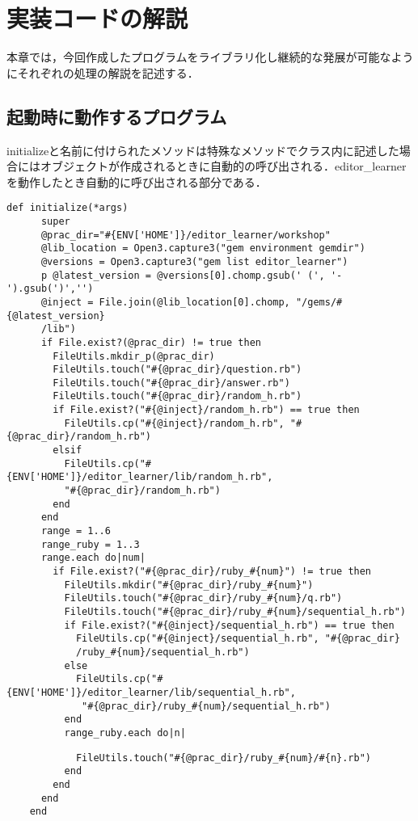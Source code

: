 \chapter{実装コードの解説}\label{ux5b9fux88c5ux30b3ux30fcux30c9ux306eux89e3ux8aac}

本章では，今回作成したプログラムをライブラリ化し継続的な発展が可能なようにそれぞれの処理の解説を記述する．

    \section{起動時に動作するプログラム}\label{ux8d77ux52d5ux6642ux306bux6bceux56deux52d5ux4f5cux3059ux308bux30d7ux30edux30b0ux30e9ux30e0}

initializeと名前に付けられたメソッドは特殊なメソッドでクラス内に記述した場合にはオブジェクトが作成されるときに自動的の呼び出される．editor\_learnerを動作したとき自動的に呼び出される部分である．

\begin{screen}
{\small
\begin{verbatim}
def initialize(*args)
      super
      @prac_dir="#{ENV['HOME']}/editor_learner/workshop"
      @lib_location = Open3.capture3("gem environment gemdir")
      @versions = Open3.capture3("gem list editor_learner")
      p @latest_version = @versions[0].chomp.gsub(' (', '-').gsub(')','')
      @inject = File.join(@lib_location[0].chomp, "/gems/#{@latest_version}
      /lib")
      if File.exist?(@prac_dir) != true then
        FileUtils.mkdir_p(@prac_dir)
        FileUtils.touch("#{@prac_dir}/question.rb")
        FileUtils.touch("#{@prac_dir}/answer.rb")
        FileUtils.touch("#{@prac_dir}/random_h.rb")
        if File.exist?("#{@inject}/random_h.rb") == true then
          FileUtils.cp("#{@inject}/random_h.rb", "#{@prac_dir}/random_h.rb")
        elsif
          FileUtils.cp("#{ENV['HOME']}/editor_learner/lib/random_h.rb", 
          "#{@prac_dir}/random_h.rb")
        end
      end
      range = 1..6
      range_ruby = 1..3
      range.each do|num|
        if File.exist?("#{@prac_dir}/ruby_#{num}") != true then
          FileUtils.mkdir("#{@prac_dir}/ruby_#{num}")
          FileUtils.touch("#{@prac_dir}/ruby_#{num}/q.rb")
          FileUtils.touch("#{@prac_dir}/ruby_#{num}/sequential_h.rb")
          if File.exist?("#{@inject}/sequential_h.rb") == true then
            FileUtils.cp("#{@inject}/sequential_h.rb", "#{@prac_dir}
            /ruby_#{num}/sequential_h.rb")
          else
            FileUtils.cp("#{ENV['HOME']}/editor_learner/lib/sequential_h.rb",
             "#{@prac_dir}/ruby_#{num}/sequential_h.rb")
          end
          range_ruby.each do|n|
\end{verbatim}}
\end{screen}
\begin{screen}
{\small
\begin{verbatim}
            FileUtils.touch("#{@prac_dir}/ruby_#{num}/#{n}.rb")
          end
        end
      end
    end
\end{verbatim}}
\end{screen}

